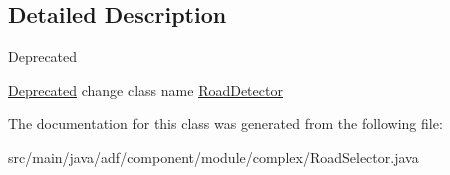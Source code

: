 \subsection{Detailed Description}
\begin{DoxyRefDesc}{Deprecated}
\item[\hyperlink{deprecated__deprecated000015}{Deprecated}]change class name \hyperlink{classadf_1_1component_1_1module_1_1complex_1_1RoadDetector}{Road\+Detector} \end{DoxyRefDesc}


The documentation for this class was generated from the following file\+:\begin{DoxyCompactItemize}
\item 
src/main/java/adf/component/module/complex/Road\+Selector.\+java\end{DoxyCompactItemize}
